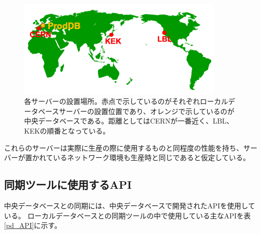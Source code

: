 \begin{figure}[bpt]\centering
\includegraphics[width=10cm]{./server_geometry.png}
\caption[各サーバーの設置場所]{各サーバーの設置場所。赤点で示しているのがそれぞれローカルデータベースサーバーの設置位置であり、オレンジで示しているのが中央データベースである。距離としてはCERNが一番近く、LBL、KEKの順番となっている。}
\label{server_geometry}
\end{figure}

これらのサーバーは実際に生産の際に使用するものと同程度の性能を持ち、サーバーが置かれているネットワーク環境も生産時と同じであると仮定している。

\subsection{同期ツールに使用するAPI}
中央データベースとの同期には、中央データベースで開発されたAPIを使用している。
ローカルデータベースとの同期ツールの中で使用している主なAPIを表\ref{pd_API}に示す。

\begin{table}[tbp]
  \begin{center}
  \caption[同期ツールの中で使用する中央データベースの主なAPI一覧]{同期ツールの中で使用する中央データベースの主なAPI一覧。同期ツールにおいて、中央データベースの情報取得には提供されているいくつかのAPIを用いており代表的なものをいかに示す。このAPIをPythonを用いて実行することで、情報取得や試験結果のアップロードをすることができる。}
  \label{pd_API}
  \end{center}
\end{table}

